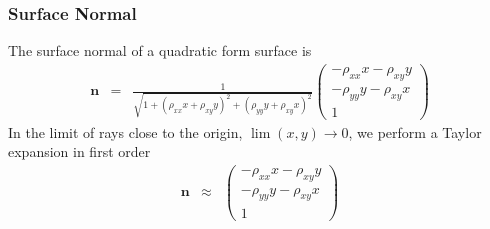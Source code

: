\documentclass[12pt,a4paper,twoside,openright,BCOR10mm,headsepline,titlepage,abstracton,chapterprefix,final]{scrreprt}
\newcommand\Vector[1]{{\mathbf{#1}}}
\begin{document}
\subsubsection{Surface Normal}
The surface normal of a quadratic form surface is
\begin{eqnarray}
 \Vector{n} &=& 
 \frac{1}{
    \sqrt{1 + (\rho_{xx} x + \rho_{xy} y)^2 + (\rho_{yy} y + \rho_{xy} x)^2 }
 } 
 \begin{pmatrix}
   - \rho_{xx} x - \rho_{xy} y \\
   - \rho_{yy} y - \rho_{xy} x \\
   1
 \end{pmatrix}
\end{eqnarray}
In the limit of rays close to the origin, $\lim (x,y) \rightarrow 0$, 
we perform a Taylor expansion in first order
\begin{eqnarray}
 \Vector{n} &\approx& 
 \begin{pmatrix}
   - \rho_{xx} x - \rho_{xy} y \\
   - \rho_{yy} y - \rho_{xy} x \\
   1
 \end{pmatrix}
 \label{eq:quadratic_form_near_axis_normal}
\end{eqnarray}
\end{document}

